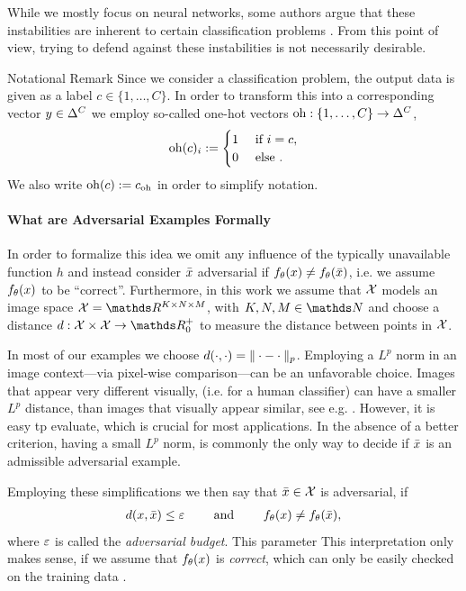 \begin{remark}{}{}
While we mostly focus on neural networks, some authors argue that these instabilities are inherent to certain classification problems \cite{shafahi2018adversarial, fawzi2018adversarial}. From this point of view, trying to defend against these instabilities is not necessarily desirable.
\end{remark}
%
%
\begin{remark}{Notational Remark}{}
Since we consider a classification problem, the output data is given as a label $c\in\{1,\ldots,C\}$. In order to transform this into a corresponding vector $y\in\Delta^C$ we employ so-called one-hot vectors ${\operatorname{oh}}:\{1,\ldots,C\}\to\Delta^C$,
%
\begin{align*}
{\operatorname{oh}}(c)_i:= \begin{cases} 1 &\text{ if } i=c,\\ 0&\text{ else }.\end{cases}
\end{align*}
%
We also write ${\operatorname{oh}}(c):= c_{{\operatorname{oh}}}$ in order to simplify notation.
\end{remark}
%
\paragraph{What are Adversarial Examples Formally} In order to formalize this idea we omit any influence of the typically unavailable function $h$ and instead consider $\bar{x}$ adversarial if $f_\theta(x)\neq f_\theta(\bar{x})$, i.e. we assume $f_\theta(x)$ to be \enquote{correct}. Furthermore, in this work we assume that $\mathcal{X}$ models an image space $\Inp=\R^{K\times N\times M}$, with $K,N,M\in\N$ and choose a distance $d:\Inp\times\Inp\to\R^+_0$ to measure the distance between points in $\mathcal{X}$. 
%
\begin{remark}{}{}
In most of our examples we choose $d(\cdot,\cdot) = \|\cdot - \cdot\|_p$. Employing a $L^p$ norm in an image context---via pixel-wise comparison---can be an unfavorable choice. Images that appear very different visually, (i.e. for a human classifier) can have a smaller $L^p$ distance, than images that visually appear similar, see e.g. \cite[Fig. 16]{stanczuk2021wasserstein}. However, it is easy tp evaluate, which is crucial for most applications. In the absence of a better criterion, having a small $L^p$ norm, is commonly the only way to decide if $\bar{x}$ is an admissible adversarial example. 
\end{remark}
%
%
\noindent%
Employing these simplifications we then say that $\bar{x}\in\mathcal{X}$ is adversarial, if
%
\begin{align*}
d(x,\bar{x}) \leq \varepsilon \qquad \text{ and } \qquad f_\theta(x)\neq f_\theta(\bar{x}),
\end{align*}
%
where $\varepsilon$ is called the \emph{adversarial budget}. This parameter
%
This interpretation only makes sense, if we assume that $f_\theta(x)$ is \emph{correct}, which can only be easily checked on the training data \cite{bungert2023begins}.
%
%
